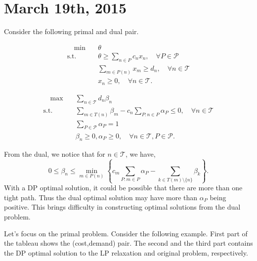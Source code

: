 \documentclass[10pt]{article}
\theoremstyle{plain}
\theoremstyle{definition}
\theoremstyle{remark}
\newcommand{\subjectto}{\text{s.t.}}
\newcommand{\cP}{\mathcal{P}}
\newcommand{\T}{\mathcal{T}}
\begin{document}
\section*{March 19th, 2015}
Consider the following primal and dual pair.

\begin{minipage}{0.5\textwidth}
	\begin{align*}
	[P]\quad \min \quad & \theta\\
	\subjectto\quad & \theta \ge \sum_{n\in P}c_nx_n, \quad \forall P\in \cP\\
	& \sum_{m\in P(n)}x_m \ge d_n,\quad \forall n\in \T\\
	& x_n\ge 0, \quad \forall n\in \T.
	\end{align*}
\end{minipage}
\begin{minipage}{0.5\textwidth}
	\begin{align*}
	[D]\quad \max \quad & \sum_{n\in \T}d_n\beta_n\\
	\subjectto\quad & \sum_{m\in T(n)}\beta_m - c_n\sum_{P:n\in P}\alpha_P \le 0, \quad \forall n\in \T\\
	& \sum_{P\in \cP}\alpha_P = 1\\
	& \beta_n\ge 0, \alpha_P\ge 0, \quad \forall n\in \T, P\in \cP.
	\end{align*}
\end{minipage}

From the dual, we notice that for $n\in \T$, we have,
\[0\le \beta_n \le \min_{m\in P(n)}\left\{ c_m\sum_{P:m\in P}\alpha_P - \sum_{k\in T(m)\setminus \{n\}}\beta_k\right\}.\]
With a DP optimal solution, it could be possible that there are more
than one tight path. Thus the dual optimal solution may have more than
$\alpha_P$ being positive. This brings difficulty in constructing optimal 
solutions from the dual problem.

Let's focus on the primal problem. Consider the following example.
First part of the tableau shows the (cost,demand) pair.
The second and the third part contains the DP optimal solution to the LP
relaxation and original problem, respectively.
\end{document}

